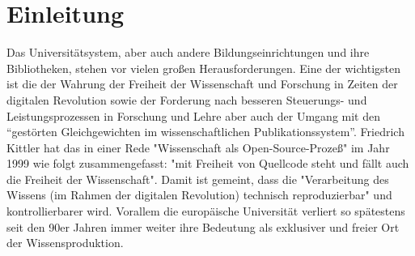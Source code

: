 \chapter{Einleitung} 
Das Universitätsystem, aber auch andere Bildungseinrichtungen und ihre Bibliotheken, stehen vor vielen großen Herausforderungen. Eine der wichtigsten ist die der Wahrung der Freiheit der Wissenschaft und Forschung in Zeiten der digitalen Revolution sowie der Forderung nach besseren Steuerungs- und Leistungsprozessen in Forschung und Lehre aber auch der Umgang mit den “gestörten Gleichgewichten im wissenschaftlichen Publikationssystem”\cite{cite:0}. Friedrich Kittler hat das in einer Rede "Wissenschaft als Open-Source-Prozeß" im Jahr 1999 wie folgt zusammengefasst: "mit Freiheit von Quellcode steht und fällt auch die Freiheit der Wissenschaft". Damit ist gemeint, dass die "Verarbeitung des Wissens (im Rahmen der digitalen Revolution) technisch reproduzierbar"\cite{cite:1} und kontrollierbarer wird. Vorallem die europäische Universität verliert so spätestens seit den 90er Jahren immer weiter ihre Bedeutung als exklusiver und freier Ort der Wissensproduktion.


